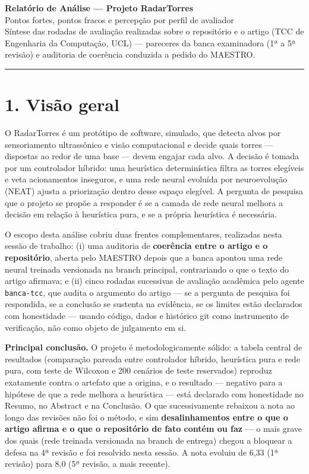 \documentclass[11pt,a4paper]{article}
\begin{document}
{\LARGE\textbf{Relatório de Análise --- Projeto RadarTorres}}\\[0.2em]
{\large Pontos fortes, pontos fracos e percepção por perfil de avaliador}\\[0.4em]
{\small Síntese das rodadas de avaliação realizadas sobre o repositório e o artigo (TCC de
Engenharia da Computação, UCL) --- pareceres da banca examinadora (1ª a 5ª revisão) e auditoria de
coerência conduzida a pedido do MAESTRO.}

\vspace{0.6em}
\hrule
\vspace{0.8em}

\section*{1. Visão geral}

O RadarTorres é um protótipo de software, simulado, que detecta alvos por sensoriamento
ultrassônico e visão computacional e decide quais torres --- dispostas ao redor de uma base ---
devem engajar cada alvo. A decisão é tomada por um controlador híbrido: uma heurística
determinística filtra as torres elegíveis e veta acionamentos inseguros, e uma rede neural evoluída
por neuroevolução (NEAT) ajusta a priorização dentro desse espaço elegível. A pergunta de pesquisa
que o projeto se propõe a responder é se a camada de rede neural melhora a decisão em relação à
heurística pura, e se a própria heurística é necessária.

O escopo desta análise cobriu duas frentes complementares, realizadas nesta sessão de trabalho:
(i) uma auditoria de \textbf{coerência entre o artigo e o repositório}, aberta pelo MAESTRO depois
que a banca apontou uma rede neural treinada versionada na branch principal, contrariando o que o
texto do artigo afirmava; e (ii) cinco rodadas sucessivas de avaliação acadêmica pelo agente
\texttt{banca-tcc}, que audita o argumento do artigo --- se a pergunta de pesquisa foi respondida,
se a conclusão se sustenta na evidência, se os limites estão declarados com honestidade --- usando
código, dados e histórico git como instrumento de verificação, não como objeto de julgamento em si.

\textbf{Principal conclusão.} O projeto é metodologicamente sólido: a tabela central de resultados
(comparação pareada entre controlador híbrido, heurística pura e rede pura, com teste de Wilcoxon e
200 cenários de teste reservados) reproduz exatamente contra o artefato que a origina, e o resultado
--- negativo para a hipótese de que a rede melhora a heurística --- está declarado com honestidade
no Resumo, no Abstract e na Conclusão. O que sucessivamente rebaixou a nota ao longo das revisões
não foi o método, e sim \textbf{desalinhamentos entre o que o artigo afirma e o que o repositório de
fato contém ou faz} --- o mais grave dos quais (rede treinada versionada na branch de entrega)
chegou a bloquear a defesa na 4ª revisão e foi resolvido nesta sessão. A nota evoluiu de 6,33 (1ª
revisão) para 8,0 (5ª revisão, a mais recente).
\end{document}
